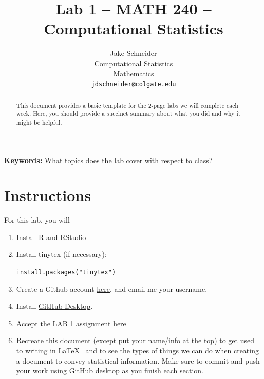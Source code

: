 \documentclass{article}\usepackage[]{graphicx}\usepackage[]{xcolor}
\begin{document}
\vspace{-1in}
\title{Lab 1 -- MATH 240 -- Computational Statistics}

\author{
  Jake Schneider \\
  Computational Statistics  \\
  Mathematics  \\
  {\tt jdschneider@colgate.edu}
}

\date{}

\maketitle

\begin{multicols}{2}
\begin{abstract}
This document provides a basic template for the 2-page labs we will complete each week. Here, you should provide a succinct summary about what you did and why it might be helpful.
\end{abstract}

\textbf{Keywords:} What topics does the lab cover with respect to class?

\section{Instructions}
For this lab, you will 

\begin{enumerate}[1.]\itemsep0em
\item Install \href{https://cran.rstudio.com}{R} and \href{https://posit.co/download/rstudio-desktop/}{RStudio}
\item Install tinytex (if necessary):

{\tt{install.packages("tinytex")}}
\item Create a Github account \href{https://github.com/}{here}, and email me your username.
\item Install \href{https://github.com/apps/desktop}{GitHub Desktop}.
\item Accept the LAB 1 assignment \href{https://classroom.github.com/assignment-invitations/49ec7c38806e92bfef8bf3094b9b11d3}{here}
\item Recreate this document (except put your name/info at the top) to get used to writing in \LaTeX~ and to see the types of things we can do when creating a document to convey statistical information. Make sure to commit and push your work using GitHub desktop as you finish each section.
\end{enumerate}


\end{multicols}
\end{document}
